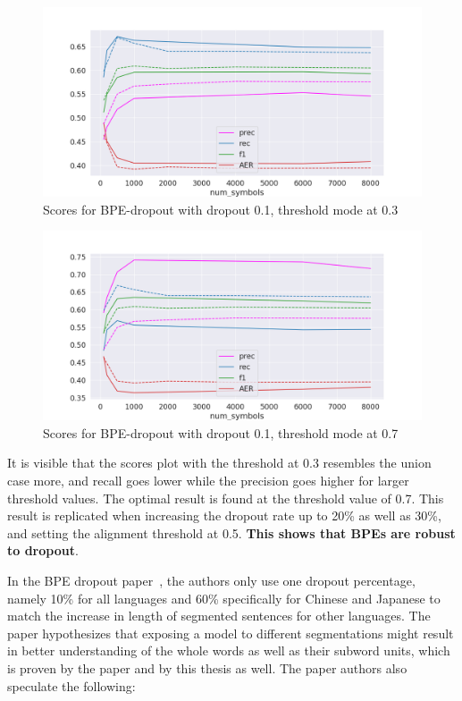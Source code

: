 \begin{figure}[!ht]
    \centering
    \includegraphics[width=12cm]{../reports/scores_dropout_bpe/space/0.1/eng_deu_0.3_thres_fastalign.png}
    \caption{Scores for BPE-dropout with dropout 0.1, threshold mode at 0.3}
\end{figure}

\begin{figure}[!ht]
    \centering
    \includegraphics[width=12cm]{../reports/scores_dropout_bpe/space/0.1/eng_deu_0.7_thres_fastalign.png}
    \caption{Scores for BPE-dropout with dropout 0.1, threshold mode at 0.7}
\end{figure}

It is visible that the scores plot with the threshold at 0.3 resembles the union case more, and recall goes lower while the precision goes higher for larger threshold values. The optimal result is found at the threshold value of 0.7. This result is replicated when increasing the dropout rate up to 20\% as well as 30\%, and setting the alignment threshold at 0.5. \textbf{This shows that BPEs are robust to dropout}.

In the BPE dropout paper~\cite{provilkov2019bpedropout}, the authors only use one dropout percentage, namely 10\% for all languages and 60\% specifically for Chinese and Japanese to match the increase in length of segmented sentences for other languages. The paper hypothesizes that exposing a model to different segmentations might result in better understanding of the whole words as well as their subword units, which is proven by the paper and by this thesis as well. The paper authors also speculate the following:

